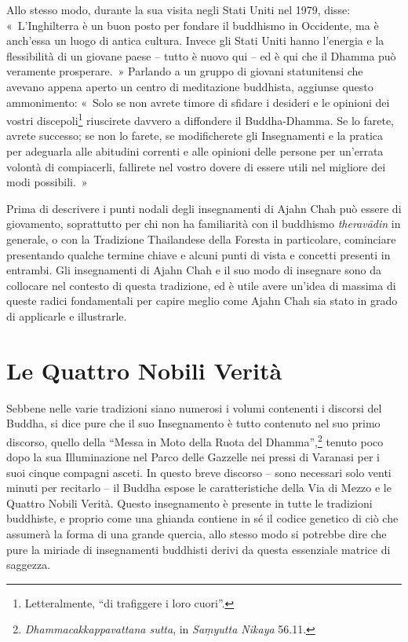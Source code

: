 Allo stesso modo, durante la sua visita negli Stati Uniti nel 1979,
disse: «~L'Inghilterra è un buon posto per fondare il buddhismo in
Occidente, ma è anch'essa un luogo di antica cultura. Invece gli Stati
Uniti hanno l'energia e la flessibilità di un giovane paese -- tutto è
nuovo qui -- ed è qui che il Dhamma può veramente prosperare.~» Parlando
a un gruppo di giovani statunitensi che avevano appena aperto un centro
di meditazione buddhista, aggiunse questo ammonimento: «~Solo se non
avrete timore di sfidare i desideri e le opinioni dei vostri
discepoli\footnote{Letteralmente, ``di trafiggere i loro cuori''.}
riuscirete davvero a diffondere il Buddha-Dhamma. Se lo farete, avrete
successo; se non lo farete, se modificherete gli Insegnamenti e la
pratica per adeguarla alle abitudini correnti e alle opinioni delle
persone per un'errata volontà di compiacerli, fallirete nel vostro
dovere di essere utili nel migliore dei modi possibili.~»

Prima di descrivere i punti nodali degli insegnamenti di Ajahn Chah può
essere di giovamento, soprattutto per chi non ha familiarità con il
buddhismo \emph{theravādin} in generale, o con la Tradizione Thailandese
della Foresta in particolare, cominciare presentando qualche termine
chiave e alcuni punti di vista e concetti presenti in entrambi. Gli
insegnamenti di Ajahn Chah e il suo modo di insegnare sono da collocare
nel contesto di questa tradizione, ed è utile avere un'idea di massima
di queste radici fondamentali per capire meglio come Ajahn Chah sia
stato in grado di applicarle e illustrarle.

\section{Le Quattro Nobili Verità}

Sebbene nelle varie tradizioni siano numerosi i volumi contenenti i
discorsi del Buddha, si dice pure che il suo Insegnamento è tutto
contenuto nel suo primo discorso, quello della ``Messa in Moto della
Ruota del Dhamma'',\footnote{\emph{Dhammacakkappavattana sutta}, in
  \emph{Saṃyutta Nikaya} 56.11.} tenuto poco dopo la sua Illuminazione
nel Parco delle Gazzelle nei pressi di Varanasi per i suoi cinque
compagni asceti. In questo breve discorso -- sono necessari solo venti
minuti per recitarlo -- il Buddha espose le caratteristiche della Via di
Mezzo e le Quattro Nobili Verità. Questo insegnamento è presente in
tutte le tradizioni buddhiste, e proprio come una ghianda contiene in sé
il codice genetico di ciò che assumerà la forma di una grande quercia,
allo stesso modo si potrebbe dire che pure la miriade di insegnamenti
buddhisti derivi da questa essenziale matrice di saggezza.

